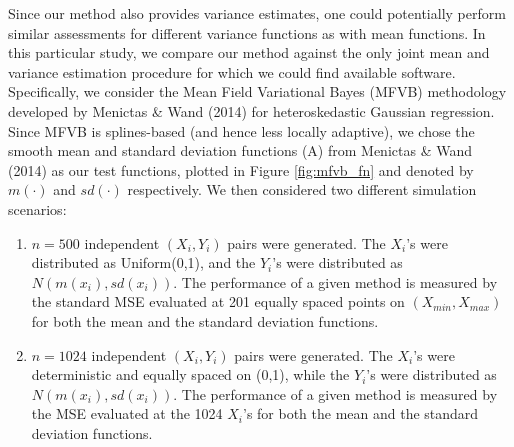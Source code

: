 \documentclass[12pt]{article}
\begin{document}
Since our method also provides variance estimates, one could potentially perform similar assessments for different variance functions as with mean functions. In this particular study, we compare our method against the only joint mean and variance estimation procedure for which we could find available software. Specifically, we consider the Mean Field Variational Bayes (MFVB) methodology developed by Menictas \& Wand (2014) for heteroskedastic Gaussian regression. Since MFVB is splines-based (and hence less locally adaptive), we chose the smooth mean and standard deviation functions (A) from Menictas \& Wand (2014) as our test functions, plotted in Figure \ref{fig:mfvb_fn} and denoted by $m(\cdot)$ and $sd(\cdot)$ respectively. We then considered two different simulation scenarios:
\begin{enumerate}
\item $n=500$ independent $(X_i,Y_i)$ pairs were generated. The $X_i$'s were distributed as Uniform(0,1), and the $Y_i$'s were distributed as $N(m(x_i),sd(x_i))$. The performance of a given method is measured by the standard MSE evaluated at 201 equally spaced points on $(X_{min},X_{max})$ for both the mean and the standard deviation functions.
\item $n=1024$ independent $(X_i,Y_i)$ pairs were generated. The $X_i$'s were deterministic and equally spaced on (0,1), while the $Y_i$'s were distributed as $N(m(x_i),sd(x_i))$. The performance of a given method is measured by the MSE evaluated at the 1024 $X_i$'s for both the mean and the standard deviation functions.
\end{enumerate}
\end{document}
